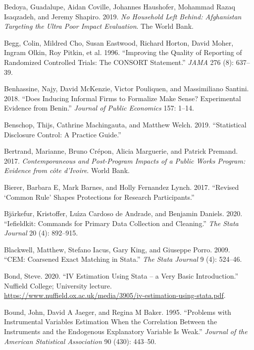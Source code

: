 \documentclass[
]{book}
\begin{document}
\leavevmode\hypertarget{ref-bedoya2019no}{}%
Bedoya, Guadalupe, Aidan Coville, Johannes Haushofer, Mohammad Razaq Isaqzadeh, and Jeremy Shapiro. 2019. \emph{No Household Left Behind: Afghanistan Targeting the Ultra Poor Impact Evaluation}. The World Bank.

\leavevmode\hypertarget{ref-begg1996improving}{}%
Begg, Colin, Mildred Cho, Susan Eastwood, Richard Horton, David Moher, Ingram Olkin, Roy Pitkin, et al. 1996. ``Improving the Quality of Reporting of Randomized Controlled Trials: The CONSORT Statement.'' \emph{JAMA} 276 (8): 637--39.

\leavevmode\hypertarget{ref-benhassine2018does}{}%
Benhassine, Najy, David McKenzie, Victor Pouliquen, and Massimiliano Santini. 2018. ``Does Inducing Informal Firms to Formalize Make Sense? Experimental Evidence from Benin.'' \emph{Journal of Public Economics} 157: 1--14.

\leavevmode\hypertarget{ref-benschop2019statistical}{}%
Benschop, Thijs, Cathrine Machingauta, and Matthew Welch. 2019. ``Statistical Disclosure Control: A Practice Guide.''

\leavevmode\hypertarget{ref-bertrand2017contemporaneous}{}%
Bertrand, Marianne, Bruno Crépon, Alicia Marguerie, and Patrick Premand. 2017. \emph{Contemporaneous and Post-Program Impacts of a Public Works Program: Evidence from côte d'Ivoire}. World Bank.

\leavevmode\hypertarget{ref-bierer2017revised}{}%
Bierer, Barbara E, Mark Barnes, and Holly Fernandez Lynch. 2017. ``Revised `Common Rule' Shapes Protections for Research Participants.''

\leavevmode\hypertarget{ref-bjarkefur2020iefieldkit}{}%
Bjärkefur, Kristoffer, Luı́za Cardoso de Andrade, and Benjamin Daniels. 2020. ``Iefieldkit: Commands for Primary Data Collection and Cleaning.'' \emph{The Stata Journal} 20 (4): 892--915.

\leavevmode\hypertarget{ref-blackwell2009cem}{}%
Blackwell, Matthew, Stefano Iacus, Gary King, and Giuseppe Porro. 2009. ``CEM: Coarsened Exact Matching in Stata.'' \emph{The Stata Journal} 9 (4): 524--46.

\leavevmode\hypertarget{ref-bond2020}{}%
Bond, Steve. 2020. ``IV Estimation Using Stata -- a Very Basic Introduction.'' Nuffield College; University lecture. \url{https://www.nuffield.ox.ac.uk/media/3905/iv-estimation-using-stata.pdf}.

\leavevmode\hypertarget{ref-bound1995problems}{}%
Bound, John, David A Jaeger, and Regina M Baker. 1995. ``Problems with Instrumental Variables Estimation When the Correlation Between the Instruments and the Endogenous Explanatory Variable Is Weak.'' \emph{Journal of the American Statistical Association} 90 (430): 443--50.
\end{document}
